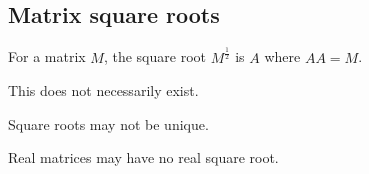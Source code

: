 
\subsection{Matrix square roots}

For a matrix \(M\), the square root \(M^{\frac{1}{2}}\) is \(A\) where \(AA=M\).

This does not necessarily exist.

Square roots may not be unique.

Real matrices may have no real square root.

